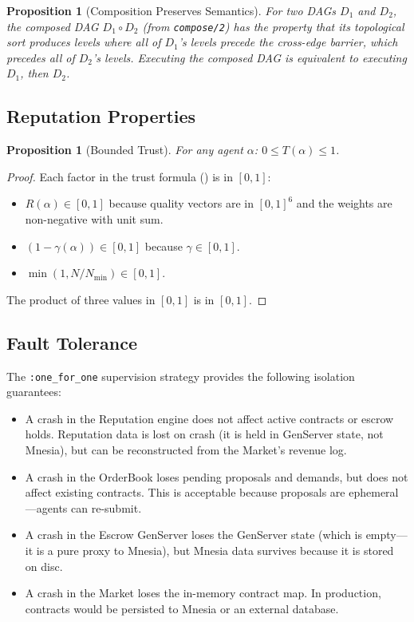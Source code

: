 \documentclass[12pt,a4paper]{article}
\theoremstyle{plain}
\newtheorem{proposition}[theorem]{Proposition}
\theoremstyle{definition}
\begin{document}
\begin{proposition}[Composition Preserves Semantics]\label{prop:compose-semantics}
For two DAGs $D_1$ and $D_2$, the composed DAG $D_1 \circ D_2$ (from \texttt{compose/2}) has the property that its topological sort produces levels where all of $D_1$'s levels precede the cross-edge barrier, which precedes all of $D_2$'s levels. Executing the composed DAG is equivalent to executing $D_1$, then $D_2$.
\end{proposition}

\subsection{Reputation Properties}

\begin{proposition}[Bounded Trust]\label{prop:bounded-trust}
For any agent $\alpha$: $0 \leq T(\alpha) \leq 1$.
\end{proposition}

\begin{proof}
Each factor in the trust formula () is in $[0, 1]$:
\begin{itemize}
    \item $R(\alpha) \in [0, 1]$ because quality vectors are in $[0, 1]^6$ and the weights are non-negative with unit sum.
    \item $(1 - \gamma(\alpha)) \in [0, 1]$ because $\gamma \in [0, 1]$.
    \item $\min(1, N/N_{\min}) \in [0, 1]$.
\end{itemize}
The product of three values in $[0, 1]$ is in $[0, 1]$.
\end{proof}

\subsection{Fault Tolerance}

The \texttt{:one\_for\_one} supervision strategy provides the following isolation guarantees:

\begin{itemize}
    \item A crash in the Reputation engine does not affect active contracts or escrow holds. Reputation data is lost on crash (it is held in GenServer state, not Mnesia), but can be reconstructed from the Market's revenue log.
    \item A crash in the OrderBook loses pending proposals and demands, but does not affect existing contracts. This is acceptable because proposals are ephemeral---agents can re-submit.
    \item A crash in the Escrow GenServer loses the GenServer state (which is empty---it is a pure proxy to Mnesia), but Mnesia data survives because it is stored on disc.
    \item A crash in the Market loses the in-memory contract map. In production, contracts would be persisted to Mnesia or an external database.
\end{itemize}
\end{document}
